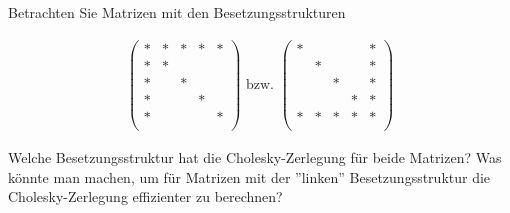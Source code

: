 \documentclass[titlepage]{article}
\begin{document}
\subsection{}
Betrachten Sie Matrizen mit den Besetzungsstrukturen

\begin{align*}
	\begin{pmatrix}
		* & * & * & * & *\\
		* & * &   &   &  \\
		* &   & * &   &  \\
		* &   &   & * &  \\
		* &   &   &   & *\\
	\end{pmatrix}
	\text{ bzw. }
	\begin{pmatrix}
	* &   &   &   & *\\
	  & * &   &   & *\\
	  &   & * &   & *\\
	  &   &   & * & *\\
	* & * & * & * & *\\
\end{pmatrix}
\end{align*}

Welche Besetzungsstruktur hat die Cholesky-Zerlegung für beide Matrizen? Was könnte man machen, um für Matrizen mit der ''linken'' Besetzungsstruktur die Cholesky-Zerlegung effizienter zu berechnen?
\end{document}
